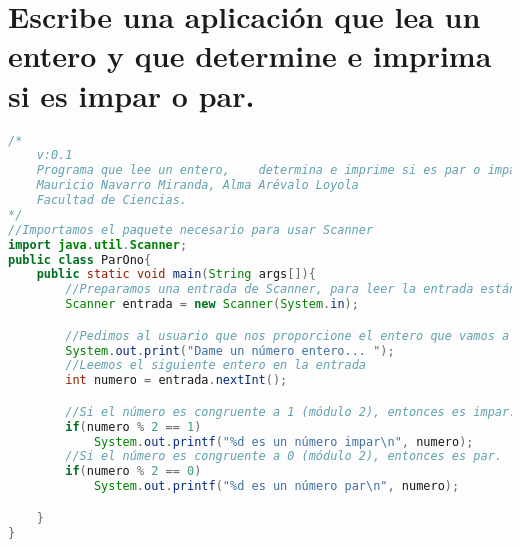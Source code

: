 \documentclass[a4paper]{article}
\begin{document}
\newpage
\section{Escribe una aplicación que lea un entero y que determine e imprima si es impar o par.}
\begin{lstlisting}[language=JAVA]
/*
    v:0.1
    Programa que lee un entero,    determina e imprime si es par o impar.
    Mauricio Navarro Miranda, Alma Arévalo Loyola
    Facultad de Ciencias.
*/
//Importamos el paquete necesario para usar Scanner
import java.util.Scanner;
public class ParOno{
    public static void main(String args[]){
        //Preparamos una entrada de Scanner, para leer la entrada estándar.
        Scanner entrada = new Scanner(System.in);

        //Pedimos al usuario que nos proporcione el entero que vamos a evaluar.
        System.out.print("Dame un número entero... ");
        //Leemos el siguiente entero en la entrada
        int numero = entrada.nextInt();

        //Si el número es congruente a 1 (módulo 2), entonces es impar.
        if(numero % 2 == 1)
            System.out.printf("%d es un número impar\n", numero);
        //Si el número es congruente a 0 (módulo 2), entonces es par.
        if(numero % 2 == 0)
            System.out.printf("%d es un número par\n", numero);

    }
}
\end{lstlisting}

\newpage
\end{document}
